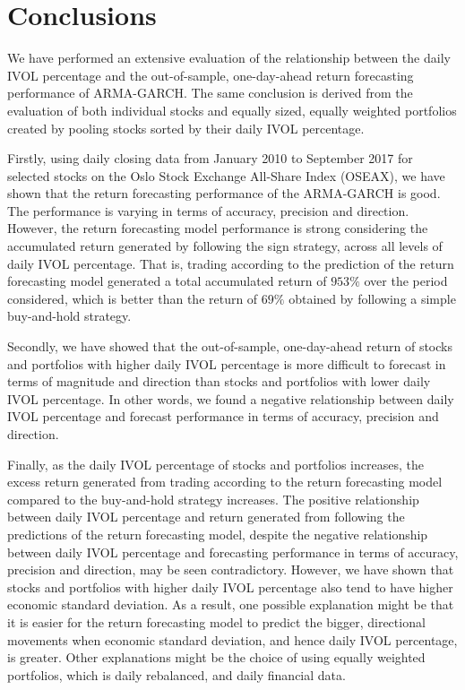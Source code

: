 
\chapter{Conclusions}
\label{Conclusions}

We have performed an extensive evaluation of the relationship between the daily IVOL percentage and the out-of-sample, one-day-ahead return forecasting performance of ARMA-GARCH. The same conclusion is derived from the evaluation of both individual stocks and equally sized, equally weighted portfolios created by pooling stocks sorted by their daily IVOL percentage. 

Firstly, using daily closing data from January 2010 to September 2017 for selected stocks on the Oslo Stock Exchange All-Share Index (OSEAX), we have shown that the return forecasting performance of the ARMA-GARCH is good. The performance is varying in terms of accuracy, precision and direction. However, the return forecasting model performance is strong considering the accumulated return generated by following the sign strategy, across all levels of daily IVOL percentage. That is, trading according to the prediction of the return forecasting model generated a total accumulated return of $953\%$ over the period considered, which is better than the return of $69\%$ obtained by following a simple buy-and-hold strategy.

Secondly, we have showed that the out-of-sample, one-day-ahead return of stocks and portfolios with higher daily IVOL percentage is more difficult to forecast in terms of magnitude and direction than stocks and portfolios with lower daily IVOL percentage. In other words, we found a negative relationship between daily IVOL percentage and forecast performance in terms of accuracy, precision and direction.

Finally, as the  daily IVOL percentage of stocks and portfolios increases, the excess return generated from trading according to the return forecasting model compared to the buy-and-hold strategy increases. The positive relationship between daily IVOL percentage and return generated from following the predictions of the return forecasting model, despite the negative relationship between daily IVOL percentage and forecasting performance in terms of accuracy, precision and direction, may be seen contradictory. However, we have shown that stocks and portfolios with higher daily IVOL percentage also tend to have higher economic standard deviation. As a result, one possible explanation might be that it is easier for the return forecasting model to predict the bigger, directional movements when economic standard deviation, and hence daily IVOL percentage, is greater. Other explanations might be the choice of using equally weighted portfolios, which is daily rebalanced, and daily financial data.
